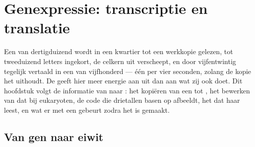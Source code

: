 \chapter{Genexpressie: transcriptie en translatie}\label{ch:b1:gene-expression}

Een  van dertigduizend  wordt in een kwartier tot een werkkopie
gelezen, tot tweeduizend letters ingekort, de celkern uit verscheept, en door
vijfentwintig  tegelijk vertaald in een  van vijfhonderd 
--- één per vier seconden, zolang de kopie het uithoudt. De  geeft hier meer
energie aan uit dan aan wat zij ook doet. Dit hoofdstuk volgt de informatie van 
naar : het kopiëren van een  tot , het bewerken van dat  bij
eukaryoten, de code die drietallen basen op  afbeeldt, het  dat
haar leest, en wat er met een  gebeurt zodra het is gemaakt.

\section{Van gen naar eiwit}

